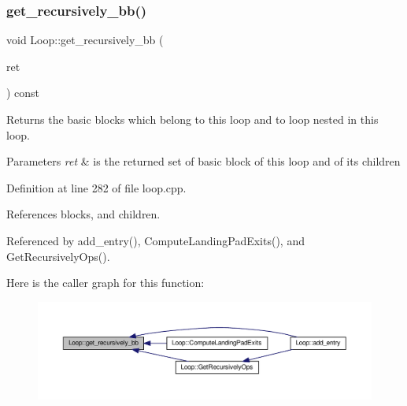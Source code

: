 \subsubsection{\texorpdfstring{get\+\_\+recursively\+\_\+bb()}{get\_recursively\_bb()}}
{\footnotesize\ttfamily void Loop\+::get\+\_\+recursively\+\_\+bb (\begin{DoxyParamCaption}\item[{\hyperlink{classCustomUnorderedSet}{Custom\+Unordered\+Set}$<$ \hyperlink{graph_8hpp_abefdcf0544e601805af44eca032cca14}{vertex} $>$ \&}]{ret }\end{DoxyParamCaption}) const}



Returns the basic blocks which belong to this loop and to loop nested in this loop. 


\begin{DoxyParams}{Parameters}
{\em ret} & is the returned set of basic block of this loop and of its children \\
\hline
\end{DoxyParams}


Definition at line 282 of file loop.\+cpp.



References blocks, and children.



Referenced by add\+\_\+entry(), Compute\+Landing\+Pad\+Exits(), and Get\+Recursively\+Ops().

Here is the caller graph for this function\+:
\nopagebreak
\begin{figure}[H]
\begin{center}
\leavevmode
\includegraphics[width=350pt]{de/d77/classLoop_a8c396bce6167020b05c88ce09d59999b_icgraph}
\end{center}
\end{figure}
\mbox{\label{classLoop_a162a9e6c7e0822bdf19965fa759bdd17}} 
